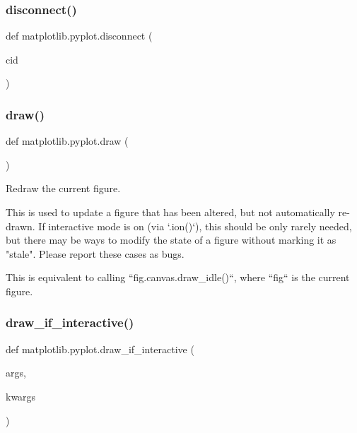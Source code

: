 \subsubsection{\texorpdfstring{disconnect()}{disconnect()}}
{\footnotesize\ttfamily def matplotlib.\+pyplot.\+disconnect (\begin{DoxyParamCaption}\item[{}]{cid }\end{DoxyParamCaption})}

\mbox{\label{namespacematplotlib_1_1pyplot_a428e77435c3452dcc641907c995d7601}} 
\subsubsection{\texorpdfstring{draw()}{draw()}}
{\footnotesize\ttfamily def matplotlib.\+pyplot.\+draw (\begin{DoxyParamCaption}{ }\end{DoxyParamCaption})}

\begin{DoxyVerb}Redraw the current figure.

This is used to update a figure that has been altered, but not
automatically re-drawn.  If interactive mode is on (via `.ion()`), this
should be only rarely needed, but there may be ways to modify the state of
a figure without marking it as "stale".  Please report these cases as bugs.

This is equivalent to calling ``fig.canvas.draw_idle()``, where ``fig`` is
the current figure.
\end{DoxyVerb}
 \mbox{\label{namespacematplotlib_1_1pyplot_ad2e69f00916e6d7884462c0ea4c8c087}} 
\subsubsection{\texorpdfstring{draw\+\_\+if\+\_\+interactive()}{draw\_if\_interactive()}}
{\footnotesize\ttfamily def matplotlib.\+pyplot.\+draw\+\_\+if\+\_\+interactive (\begin{DoxyParamCaption}\item[{}]{args,  }\item[{}]{kwargs }\end{DoxyParamCaption})}

